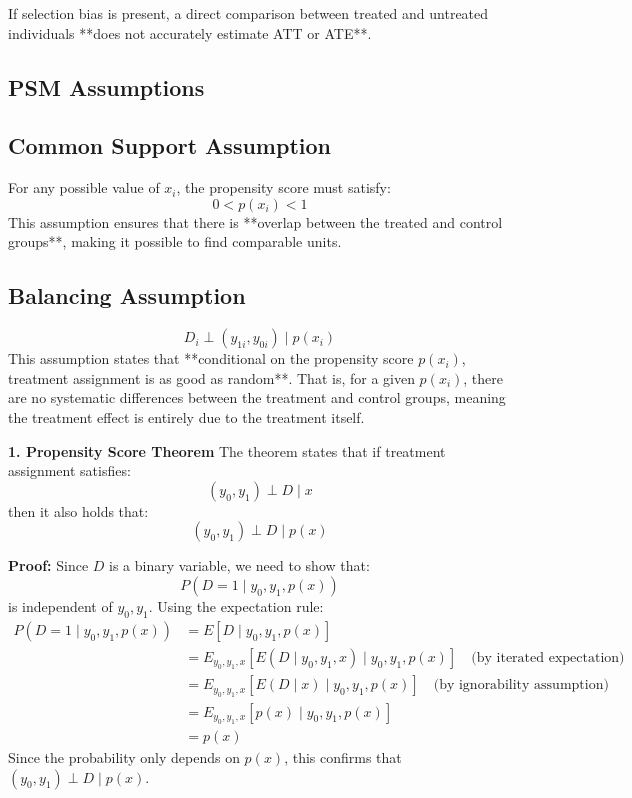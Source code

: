 \documentclass[10pt, oneside]{article}
\begin{document}
If selection bias is present, a direct comparison between treated and untreated individuals **does not accurately estimate ATT or ATE**.

\subsection{PSM Assumptions}

\subsection{Common Support Assumption}
For any possible value of $x_i$, the propensity score must satisfy:
\begin{equation}
0 < p(x_i) < 1
\end{equation}
This assumption ensures that there is **overlap between the treated and control groups**, making it possible to find comparable units.

\subsection{Balancing Assumption}
\begin{equation}
D_i \perp (y_{1i}, y_{0i}) \mid p(x_i)
\end{equation}
This assumption states that **conditional on the propensity score $p(x_i)$, treatment assignment is as good as random**. That is, for a given $p(x_i)$, there are no systematic differences between the treatment and control groups, meaning the treatment effect is entirely due to the treatment itself.

\textbf{1. Propensity Score Theorem}
The theorem states that if treatment assignment satisfies:
\begin{equation}
(y_0, y_1) \perp D \mid x
\end{equation}
then it also holds that:
\begin{equation}
(y_0, y_1) \perp D \mid p(x)
\end{equation}

\textbf{Proof:} Since $D$ is a binary variable, we need to show that:
\begin{equation}
P(D=1 \mid y_0, y_1, p(x))
\end{equation}
is independent of $y_0, y_1$. Using the expectation rule:
\begin{align*}
P(D=1 \mid y_0, y_1, p(x)) &= E[D \mid y_0, y_1, p(x)] \\
&= E_{y_0, y_1, x} [E(D \mid y_0, y_1, x) \mid y_0, y_1, p(x)] \quad \text{(by iterated expectation)} \\
&= E_{y_0, y_1, x} [E(D \mid x) \mid y_0, y_1, p(x)] \quad \text{(by ignorability assumption)} \\
&= E_{y_0, y_1, x} [p(x) \mid y_0, y_1, p(x)] \\
&= p(x)
\end{align*}
Since the probability only depends on $p(x)$, this confirms that $(y_0, y_1) \perp D \mid p(x)$.
\end{document}

